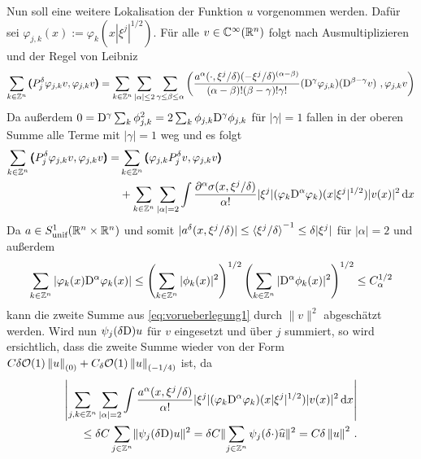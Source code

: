 Nun soll eine weitere Lokalisation der Funktion $u$ vorgenommen werden. Dafür sei $\varphi_{j,k}(x):=\varphi_k(x|\xi^j|^{1/2})$. Für alle $v\in\mathbb C^\infty(\mathbb R^n)$ folgt nach Ausmultiplizieren und der Regel von Leibniz
\begin{align}
\sum_{k\in\Z^n}\spro {P^\delta_j\varphi_{j,k}v} {\varphi_{j,k}v} = \sum_{k\in\Z^n}\sum_{|\alpha|\le 2}\sum_{\gamma\le\beta\le\alpha} \left({\frac{a^\alpha(\cdot,\xi^j/\delta)(-\xi^j/\delta)^{(\alpha-\beta)}}{(\alpha-\beta)!(\beta-\gamma)!\gamma!}(\D^\gamma\varphi_{j,k})(\D^{\beta-\gamma}v)}\ , {\varphi_{j,k}v}\right)
\end{align}
Da außerdem $0=\mathrm D^\gamma\sum_k\phi_{j,k}^2 = 2 \sum_k\phi_{j,k}\mathrm D^\gamma\phi_{j,k}$ für $|\gamma|=1$ fallen in der oberen Summe alle Terme mit $|\gamma|=1$ weg und es folgt
\begin{align}\label{eq:vorueberlegung1}
\sum_{k\in\mathbb Z^n}\pmb(P^\delta_j\varphi_{j,k}v,\varphi_{j,k}v\pmb) = &\sum_{k\in\mathbb Z^n}\pmb(\varphi_{j,k}P^\delta_jv,\varphi_{j,k}v\pmb) \\&+ \sum_{k\in\mathbb Z^n}\sum_{|\alpha|=2}\int \frac{\partial^\alpha\sigma(x,\xi^j/\delta)}{\alpha!} |\xi^j|(\varphi_k\mathrm D^\alpha\varphi_k)(x|\xi^j|^{1/2})|v(x)|^2\,\mathrm d x\nonumber
\end{align}
Da $a\in S^1_\text{unif}(\mathbb R^n\times\mathbb R^n)$ und somit $|a^\delta(x,\xi^j/\delta)|\le\braket{\xi^j/\delta}^{-1}\le \delta|\xi^j|$ für $|\alpha|=2$ und außerdem
\begin{align}
\sum_{k\in\mathbb Z^n} |\varphi_k(x)\mathrm D^\alpha\varphi_k(x)|\le \left(\sum_{k\in\mathbb Z^n}|\phi_k(x)|^2\right)^{1/2}\left(\sum_{k\in\mathbb Z^n}|\mathrm D^\alpha\phi_k(x)|^2\right)^{1/2}\le C_\alpha^{1/2}
\end{align}
kann die zweite Summe aus \eqref{eq:vorueberlegung1} durch $\|v\|^2$ abgeschätzt werden. Wird nun $\psi_j(\delta\mathrm D)u$ für $v$ eingesetzt und über $j$ summiert, so wird ersichtlich, dass die zweite Summe wieder von der Form $C\delta \mathcal{O}(1) \left\lVert u\right\rVert_{(0)} + C_\delta \mathcal O(1)\left\lVert u\right\rVert_{(-1/4)}$ ist, da
\begin{align}
\begin{split}
\left|\sum_{j,k\in\mathbb Z^n}\sum_{|\alpha|=2}\int \frac{a^\alpha(x,\xi^j/\delta)}{\alpha!} |\xi^j|(\varphi_k\mathrm D^\alpha\varphi_k)(x|\xi^j|^{1/2})|v(x)|^2\,\mathrm d x\right|\\ \le \delta C \sum_{j\in\mathbb Z^n} \lVert\psi_j(\delta\mathrm D)u\rVert^2 = \delta C \lVert\sum_{j\in\mathbb Z^n} \psi_j(\delta \cdot)\widehat u\rVert^2 = C \delta \left\lVert u\right\rVert ^2\,.
\end{split}
\end{align}
